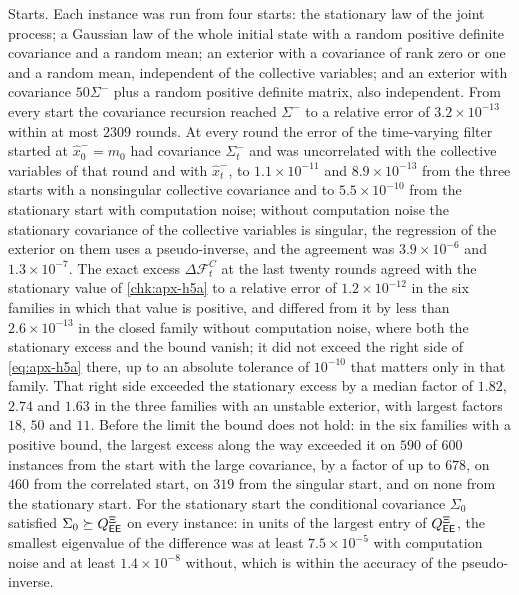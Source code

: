 \begin{numcheck}
Starts. Each instance was run from four starts: the stationary law of the joint process; a Gaussian law of the whole initial state with a random positive definite covariance and a random mean; an exterior with a covariance of rank zero or one and a random mean, independent of the collective variables; and an exterior with covariance $50\Sigma^-$ plus a random positive definite matrix, also independent. From every start the covariance recursion reached $\Sigma^-$ to a relative error of $3.2\times10^{-13}$ within at most $2309$ rounds. At every round the error of the time-varying filter started at $\hat x^-_0=m_0$ had covariance $\Sigma^-_t$ and was uncorrelated with the collective variables of that round and with $\hat x^-_t$, to $1.1\times10^{-11}$ and $8.9\times10^{-13}$ from the three starts with a nonsingular collective covariance and to $5.5\times10^{-10}$ from the stationary start with computation noise; without computation noise the stationary covariance of the collective variables is singular, the regression of the exterior on them uses a pseudo-inverse, and the agreement was $3.9\times10^{-6}$ and $1.3\times10^{-7}$. The exact excess $\Delta\mathcal F^C_t$ at the last twenty rounds agreed with the stationary value of \cref{chk:apx-h5a} to a relative error of $1.2\times10^{-12}$ in the six families in which that value is positive, and differed from it by less than $2.6\times10^{-13}$ in the closed family without computation noise, where both the stationary excess and the bound vanish; it did not exceed the right side of \cref{eq:apx-h5a} there, up to an absolute tolerance of $10^{-10}$ that matters only in that family. That right side exceeded the stationary excess by a median factor of $1.82$, $2.74$ and $1.63$ in the three families with an unstable exterior, with largest factors $18$, $50$ and $11$. Before the limit the bound does not hold: in the six families with a positive bound, the largest excess along the way exceeded it on $590$ of $600$ instances from the start with the large covariance, by a factor of up to $678$, on $460$ from the correlated start, on $319$ from the singular start, and on none from the stationary start. For the stationary start the conditional covariance $\Sigma_0$ satisfied $\Sigma_0\succeq Q^{\Xi}_{\mathsf{E}\mathsf{E}}$ on every instance: in units of the largest entry of $Q^{\Xi}_{\mathsf{E}\mathsf{E}}$, the smallest eigenvalue of the difference was at least $7.5\times10^{-5}$ with computation noise and at least $1.4\times10^{-8}$ without, which is within the accuracy of the pseudo-inverse.


\end{numcheck}
